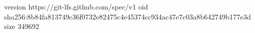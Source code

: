 version https://git-lfs.github.com/spec/v1
oid sha256:8b84fa813749c36f0732e82475c4e45374cc934ac47e7c03a8b642749b177e3d
size 349692
